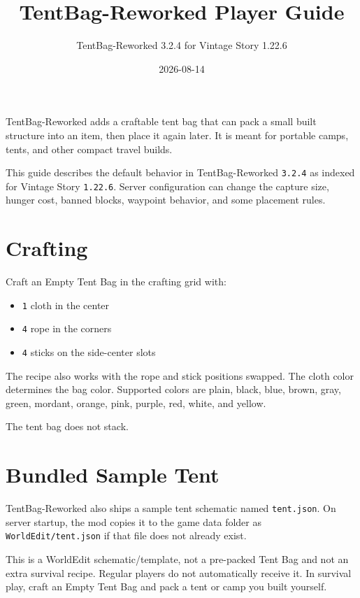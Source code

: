 \documentclass[
  11pt,
  letterpaper,
  titlepage]{article}
\title{TentBag-Reworked Player Guide}
\subtitle{TentBag-Reworked 3.2.4 for Vintage Story 1.22.6}
\author{}
\date{2026-08-14}
\providecommand{\tightlist}{%
  \setlength{\itemsep}{0pt}\setlength{\parskip}{0pt}}
\begin{document}
\maketitle

{
\hypersetup{linkcolor=black}
\setcounter{tocdepth}{2}
\tableofcontents
}
TentBag-Reworked adds a craftable tent bag that can pack a small built
structure into an item, then place it again later. It is meant for
portable camps, tents, and other compact travel builds.

This guide describes the default behavior in TentBag-Reworked
\texttt{3.2.4} as indexed for Vintage Story \texttt{1.22.6}. Server
configuration can change the capture size, hunger cost, banned blocks,
waypoint behavior, and some placement rules.

\section{Crafting}\label{crafting}

Craft an Empty Tent Bag in the crafting grid with:

\begin{itemize}
\tightlist
\item
  \texttt{1} cloth in the center
\item
  \texttt{4} rope in the corners
\item
  \texttt{4} sticks on the side-center slots
\end{itemize}

The recipe also works with the rope and stick positions swapped. The
cloth color determines the bag color. Supported colors are plain, black,
blue, brown, gray, green, mordant, orange, pink, purple, red, white, and
yellow.

The tent bag does not stack.

\section{Bundled Sample Tent}\label{bundled-sample-tent}

TentBag-Reworked also ships a sample tent schematic named
\texttt{tent.json}. On server startup, the mod copies it to the game
data folder as \texttt{WorldEdit/tent.json} if that file does not
already exist.

This is a WorldEdit schematic/template, not a pre-packed Tent Bag and
not an extra survival recipe. Regular players do not automatically
receive it. In survival play, craft an Empty Tent Bag and pack a tent or
camp you built yourself.
\end{document}
